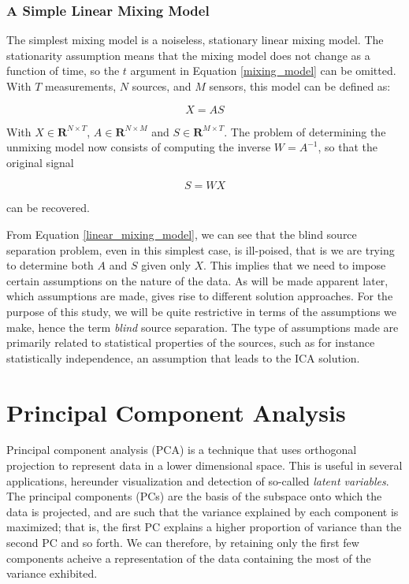 \message{ !name(main.tex)}\documentclass[]{report}   %
\begin{document}
\subsection{A Simple Linear Mixing Model}

The simplest mixing model is a noiseless, stationary linear mixing model. The stationarity assumption means that the mixing model does not change as a function of time, so the $t$ argument in Equation \ref{mixing_model} can be omitted. With $T$ measurements, $N$ sources, and $M$ sensors, this model can be defined as:


\begin{equation}\label{linear_mixing_model}
  X = AS
\end{equation}

With $X \in \mathbf{R}^{N\times T}$, $A \in \mathbf{R}^{N\times M}$ and $S \in \mathbf{R}^{M\times T}$. The problem of determining the unmixing model now consists of computing the inverse $W = A^{-1}$, so that the original signal 

\begin{equation}\label{linear_unmixing_model}
S = WX
\end{equation}

can be recovered.

From Equation \ref{linear_mixing_model}, we can see that the blind source separation problem, even in this simplest case, is ill-poised, that is we are trying to determine both $A$ and $S$ given only $X$. This implies that we need to impose certain assumptions on the nature of the data. As will be made apparent later, which assumptions are made, gives rise to different solution approaches. For the purpose of this study, we will be quite restrictive in terms of the assumptions we make, hence the term \emph{blind} source separation. The type of assumptions made are primarily related to statistical properties of the sources, such as for instance statistically independence, an assumption that leads to the ICA solution.

\chapter{Principal Component Analysis}

Principal component analysis (PCA) is a technique that uses orthogonal projection to represent data in a lower dimensional space. This is useful in several applications, hereunder visualization and detection of so-called \emph{latent variables}. The principal components (PCs) are the basis of the subspace onto which the data is projected, and are such that the variance explained by each component is maximized; that is, the first PC explains a higher proportion of variance than the second PC and so forth. We can therefore, by retaining only the first few components acheive a representation of the data containing the most of the variance exhibited.
\end{document}
